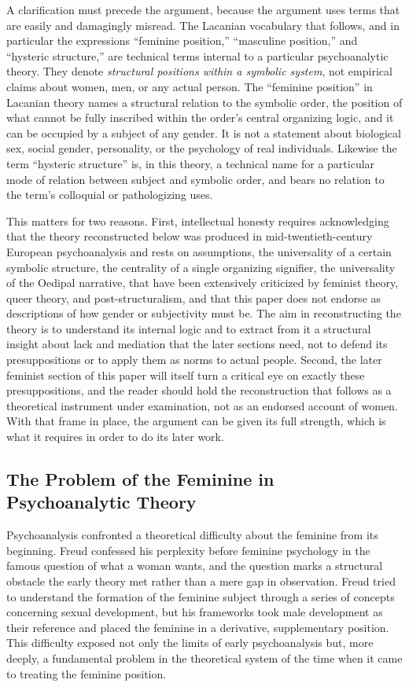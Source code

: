 \documentclass[11pt,a4paper]{article}
\begin{document}
A clarification must precede the argument, because the argument uses terms that are easily and damagingly misread. The Lacanian vocabulary that follows, and in particular the expressions ``feminine position,'' ``masculine position,'' and ``hysteric structure,'' are technical terms internal to a particular psychoanalytic theory. They denote \textit{structural positions within a symbolic system}, not empirical claims about women, men, or any actual person. The ``feminine position'' in Lacanian theory names a structural relation to the symbolic order, the position of what cannot be fully inscribed within the order's central organizing logic, and it can be occupied by a subject of any gender. It is not a statement about biological sex, social gender, personality, or the psychology of real individuals. Likewise the term ``hysteric structure'' is, in this theory, a technical name for a particular mode of relation between subject and symbolic order, and bears no relation to the term's colloquial or pathologizing uses.

This matters for two reasons. First, intellectual honesty requires acknowledging that the theory reconstructed below was produced in mid-twentieth-century European psychoanalysis and rests on assumptions, the universality of a certain symbolic structure, the centrality of a single organizing signifier, the universality of the Oedipal narrative, that have been extensively criticized by feminist theory, queer theory, and post-structuralism, and that this paper does not endorse as descriptions of how gender or subjectivity must be. The aim in reconstructing the theory is to understand its internal logic and to extract from it a structural insight about lack and mediation that the later sections need, not to defend its presuppositions or to apply them as norms to actual people. Second, the later feminist section of this paper will itself turn a critical eye on exactly these presuppositions, and the reader should hold the reconstruction that follows as a theoretical instrument under examination, not as an endorsed account of women. With that frame in place, the argument can be given its full strength, which is what it requires in order to do its later work.

\subsection{The Problem of the Feminine in Psychoanalytic Theory}

Psychoanalysis confronted a theoretical difficulty about the feminine from its beginning. Freud confessed his perplexity before feminine psychology in the famous question of what a woman wants, and the question marks a structural obstacle the early theory met rather than a mere gap in observation. Freud tried to understand the formation of the feminine subject through a series of concepts concerning sexual development, but his frameworks took male development as their reference and placed the feminine in a derivative, supplementary position. This difficulty exposed not only the limits of early psychoanalysis but, more deeply, a fundamental problem in the theoretical system of the time when it came to treating the feminine position.
\end{document}
